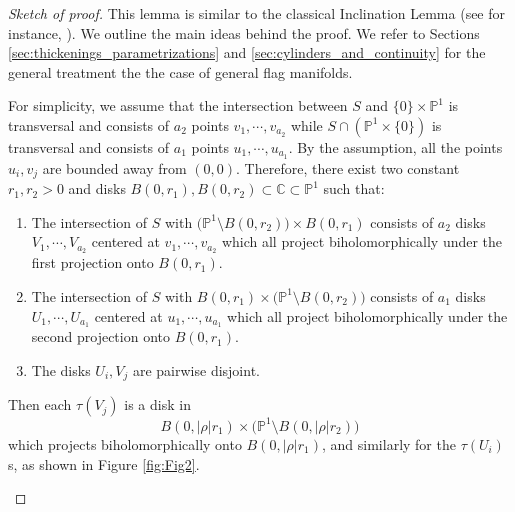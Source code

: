 \documentclass[12pt]{amsbook}%
\theoremstyle{definition}
\theoremstyle{remark}
\numberwithin{section}{chapter}
\numberwithin{subsection}{section}
\numberwithin{figure}{chapter}
\def\dyl{>0}
\def\bC{{\mathbb{C}}}
\def\bP{{\mathbb{P}}}
\begin{document}
{{\begin{proof}[Sketch of proof]
This lemma is similar to the classical Inclination Lemma (see for instance, \cite[Proposition 6.2.23]{KHbook}). 
We outline the main ideas behind the proof. We refer to 
Sections \ref{sec:thickenings_parametrizations} and \ref{sec:cylinders_and_continuity} for the general treatment the the case of general flag manifolds. 

For simplicity, we assume that the intersection between $S$ and $\{0\}\times \bP^1$ is transversal and consists of $a_2$ points $v_1,\cdots,v_{a_2}$ while $S\cap (\bP^1\times \{0\})$ is transversal and consists of $a_1$ points $u_1,\cdots,u_{a_1}$. By the assumption, all the points $u_i, v_j$ are bounded away from $(0,0)$. Therefore, there exist two constant $r_1,r_2\dyl$ and disks $B(0,r_1), B(0,r_2)\subset \bC\subset \bP^1$ such that: \\

\begin{enumerate}
\item The intersection of $S$ with $\big(\bP^1\setminus B(0,r_2)\big)\times B(0,r_1)$ consists of $a_2$ disks $V_1,\cdots,V_{a_2}$ centered at $v_1,\cdots,v_{a_2}$ which all project biholomorphically under the first projection onto $B(0,r_1)$.\\

\item The intersection of $S$ with $B(0,r_1)\times \big(\bP^1\setminus B(0,r_2)\big)$ consists of $a_1$ disks $U_1,\cdots,U_{a_1}$ centered at $u_1,\cdots,u_{a_1}$ which all project biholomorphically under the second projection onto $B(0,r_1)$.\\

\item The disks $U_i,V_j$ are pairwise disjoint.
\end{enumerate}

\medskip 
Then each $\tau(V_j)$ is a disk in 
\[B(0,\lvert \rho\rvert r_1)\times \big(\bP^1\setminus B(0,\lvert \rho \rvert r_2)\big)\]
which projects biholomorphically onto $B(0,\lvert \rho\rvert r_1)$, and similarly for the $\tau(U_i)$s, as shown in Figure \ref{fig:Fig2}.

\begin{center}
\begin{figure}
\end{figure}
\end{center}
\end{proof}}}
\end{document}

